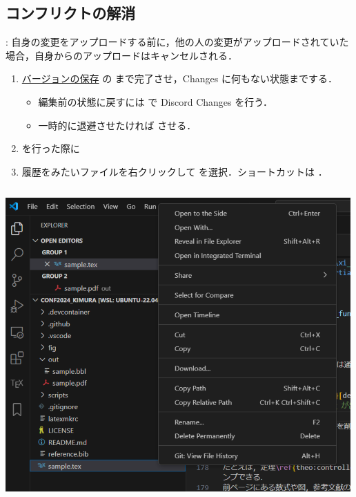 \documentclass[aspectratio=169,dvipdfmx,cjk]{beamer}
\begin{document}
\subsection{コンフリクトの解消}
\begin{frame}{\insertsection \thesubsection: \insertsubsection}
  自身の変更をアップロードする前に，他の人の変更がアップロードされていた場合，自身からのアップロードはキャンセルされる．
  \begin{enumerate}
    \item \hyperlink{git}{バージョンの保存} の  まで完了させ，Changes に何もない状態までする．
    \begin{itemize}
      \item 編集前の状態に戻すには  で Discord Changes を行う．
      \item 一時的に退避させたければ  させる\cite{GitStash}．
    \end{itemize}
    \item {} を行った際に
    \item 履歴をみたいファイルを右クリックして を選択．ショートカットは ．
  \end{enumerate}
  \begin{columns}
    \begin{column}{0.3\textwidth}
        \includegraphics[width=1.0\linewidth]{fig/git-history1.png}
    \end{column}

\end{columns}
\end{frame}
\end{document}
